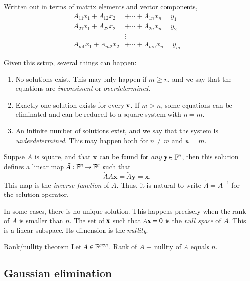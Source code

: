 Written out in terms of matrix elements and vector components,
\begin{align}
    A_{11} x_1 + A_{12} x_2 &+ \cdots + A_{1n} x_n = y_1 \\
    A_{21} x_1 + A_{22} x_2 &+ \cdots + A_{2n} x_n = y_2 \\
    &\vdots \\
    A_{m1} x_1 + A_{m2} x_2 &+ \cdots + A_{mn} x_n = y_m   
\end{align}

Given this setup, several things can happen:
\begin{enumerate}
    \item No solutions exist. This may only happen if $m \geq n$, and we say that the equations are \emph{inconsistent} or \emph{overdetermined}. 
    \item Exactly one solution exists for every $\mathbf{y}$. If  $m  > n$, some equations can be eliminated and can be reduced to a square system with $n=m$.
    \item An infinite number of solutions exist, and we say that the system is \emph{underdetermined}. This may happen both for $n\neq m$ and $n=m$.
\end{enumerate}

Suppse $A$ is square, and that $\mathbf{x}$ can be found for \emph{any} $\mathbf{y}\in\mathbb{F}^n$, then this solution defines a linear map $\tilde{A} : \mathbb{F}^n \to \mathbb{F}^n$ such that
\[ \tilde{A} A \mathbf{x} = \tilde{A} \mathbf{y} = \mathbf{x}. \]
This map is the \emph{inverse function} of $A$.
Thus, it is natural to write $\tilde{A} = A^{-1}$ for the solution operator.

In some cases, there is no unique solution. This happens precisely when the rank of $A$ is smaller than $n$. The set of $\mathbf{x}$ such that $A\mathbf{x}=0$ is the \emph{null space} of $A$. This is a linear subspace. Its dimension is the \emph{nullity}.

\begin{myTheorem}{Rank/nullity theorem}{}
    Let $A \in \mathbb{F}^{m\times n}$.
    Rank of $A$ $+$ nullity of $A$ equals $n$.
\end{myTheorem}



\subsection{Gaussian elimination}

